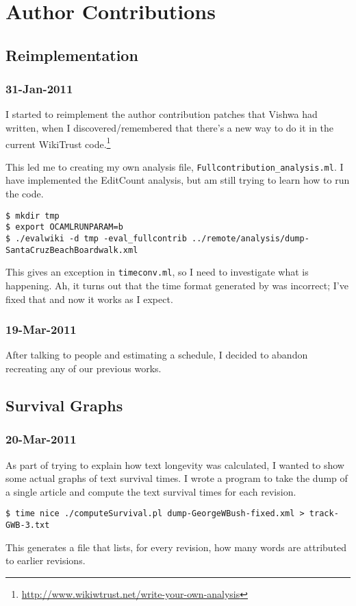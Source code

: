 \chapter{Author Contributions}

\section{Reimplementation}

\subsection{31-Jan-2011}

I started to reimplement the author contribution patches that
Vishwa had written, when I discovered/remembered that there's a
new way to do it in the current WikiTrust
code.\footnote{\url{http://www.wikiwtrust.net/write-your-own-analysis}}

This led me to creating my own analysis file,
\texttt{Fullcontribution\_analysis.ml}.
I have implemented the EditCount analysis, but am
still trying to learn how to run the code.
\begin{verbatim}
$ mkdir tmp
$ export OCAMLRUNPARAM=b
$ ./evalwiki -d tmp -eval_fullcontrib ../remote/analysis/dump-SantaCruzBeachBoardwalk.xml
\end{verbatim}
This gives an exception in \texttt{timeconv.ml}, so I need
to investigate what is happening.
Ah, it turns out that the time format generated by
 was incorrect; I've fixed that
and now it works as I expect.

\subsection{19-Mar-2011}

After talking to people and estimating a schedule, I decided
to abandon recreating any of our previous works.

\section{Survival Graphs}

\subsection{20-Mar-2011}

As part of trying to explain how text longevity was calculated,
I wanted to show some actual graphs of text survival times.
I wrote a program to take the dump of a single article and compute
the text survival times for each revision.
\begin{verbatim}
$ time nice ./computeSurvival.pl dump-GeorgeWBush-fixed.xml > track-GWB-3.txt
\end{verbatim}
This generates a file that lists, for every revision, how many words
are attributed to earlier revisions.

